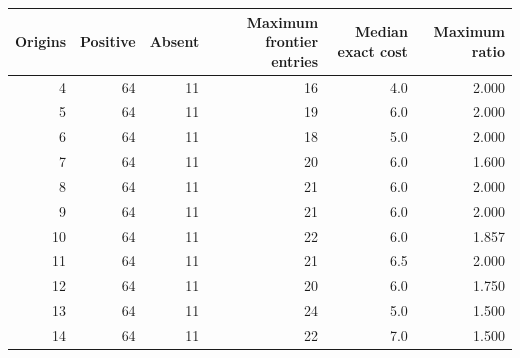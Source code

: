 \begin{tabular}{rrrrrr}
\toprule
Origins & Positive & Absent & Maximum frontier entries & Median exact cost & Maximum ratio \\
\midrule
4 & 64 & 11 & 16 & 4.0 & 2.000 \\
5 & 64 & 11 & 19 & 6.0 & 2.000 \\
6 & 64 & 11 & 18 & 5.0 & 2.000 \\
7 & 64 & 11 & 20 & 6.0 & 1.600 \\
8 & 64 & 11 & 21 & 6.0 & 2.000 \\
9 & 64 & 11 & 21 & 6.0 & 2.000 \\
10 & 64 & 11 & 22 & 6.0 & 1.857 \\
11 & 64 & 11 & 21 & 6.5 & 2.000 \\
12 & 64 & 11 & 20 & 6.0 & 1.750 \\
13 & 64 & 11 & 24 & 5.0 & 1.500 \\
14 & 64 & 11 & 22 & 7.0 & 1.500 \\
\bottomrule
\end{tabular}
